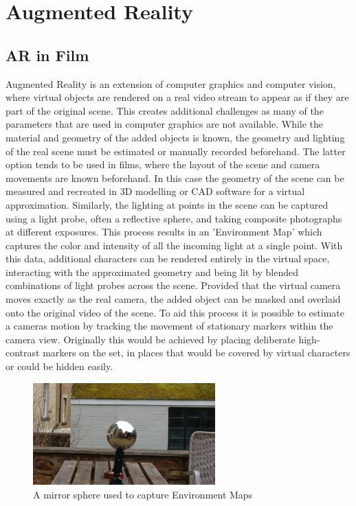 \documentclass[ %
                    author={Gavin Parker},
                supervisor={Dr. Neill Campbell},
                    degree={MEng},
                     title={Deep Siamese Networks for Illumination Estimation from Stereo Images},
                  subtitle={},
                      type={research},
                      year={2018} ]{dissertation}
\begin{document}
\section{Augmented Reality}
\subsection{AR in Film}

Augmented Reality is an extension of computer graphics and computer vision, where virtual objects are rendered on a real video stream to appear as if they are part of the original scene. This creates additional challenges as many of the parameters that are used in computer graphics are not available. While the material and geometry of the added objects is known, the geometry and lighting of the real scene must be estimated or manually recorded beforehand. The latter option tends to be used in films, where the layout of the scene and camera movements are known beforehand. In this case the geometry of the scene can be measured and recreated in 3D modelling or CAD software for a virtual approximation. Similarly, the lighting at points in the scene can be captured using a light probe, often a reflective sphere, and taking composite photographs at different exposures. This process results in an 'Environment Map' which captures the color and intensity of all the incoming light at a single point. With this data, additional characters can be rendered entirely in the virtual space, interacting with the approximated geometry and being lit by blended combinations of light probes across the scene. Provided that the virtual camera moves exactly as the real camera, the added object can be masked and overlaid onto the original video of the scene. To aid this process it is possible to estimate a cameras motion by tracking the movement of stationary markers within the camera view. Originally this would be achieved by placing deliberate high-contrast markers on the set, in places that would be covered by virtual characters or could be hidden easily.

\begin{figure}[H]
\centering
\includegraphics[width=7cm]{images/envmap}
\caption{A mirror sphere used to capture Environment Maps}
\end{figure}
\end{document}
